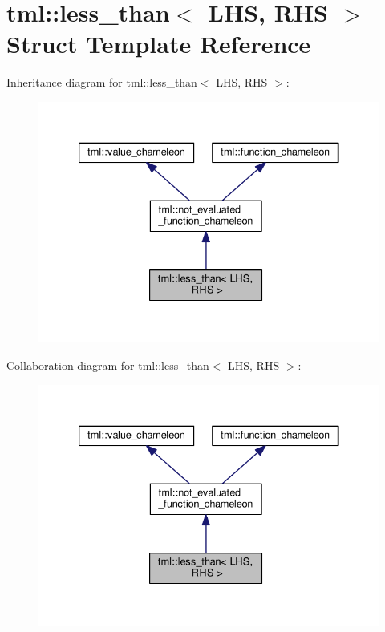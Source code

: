 \hypertarget{structtml_1_1less__than}{\section{tml\+:\+:less\+\_\+than$<$ L\+H\+S, R\+H\+S $>$ Struct Template Reference}
\label{structtml_1_1less__than}
}


Inheritance diagram for tml\+:\+:less\+\_\+than$<$ L\+H\+S, R\+H\+S $>$\+:
\nopagebreak
\begin{figure}[H]
\begin{center}
\leavevmode
\includegraphics[width=333pt]{structtml_1_1less__than__inherit__graph}
\end{center}
\end{figure}


Collaboration diagram for tml\+:\+:less\+\_\+than$<$ L\+H\+S, R\+H\+S $>$\+:
\nopagebreak
\begin{figure}[H]
\begin{center}
\leavevmode
\includegraphics[width=333pt]{structtml_1_1less__than__coll__graph}
\end{center}
\end{figure}
